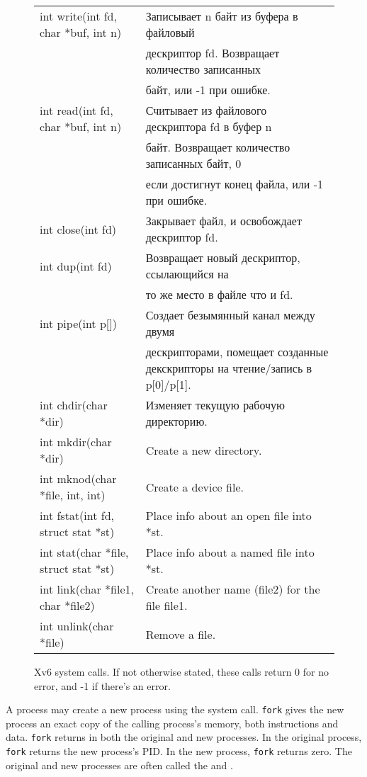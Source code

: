 \begin{figure}[t]
\begin{tabular}{ll}
\midrule
int write(int fd, char *buf, int n) & Записывает n байт из буфера в файловый \\
                                    & дескриптор fd. Возвращает количество записанных \\
                                    & байт, или -1 при ошибке. \\
\midrule
int read(int fd, char *buf, int n) & Считывает из файлового дескриптора fd в буфер n \\
                                   & байт. Возвращает количество записанных байт, 0 \\
                                   & если достигнут конец файла, или -1 при ошибке. \\
\midrule
int close(int fd) & Закрывает файл, и освобождает дескриптор fd. \\
\midrule
int dup(int fd) & Возвращает новый дескриптор, ссылающийся на \\
                & то же место в файле что и fd.\\
\midrule
int pipe(int p[]) & Создает безымянный канал между двумя \\
                  & дескрипторами, помещает созданные декскрипторы на чтение/запись в p[0]/p[1]. \\
\midrule
int chdir(char *dir) & Изменяет текущую рабочую директорию. \\
\midrule
int mkdir(char *dir) & Create a new directory. \\
\midrule
int mknod(char *file, int, int) & Create a device file. \\
\midrule
int fstat(int fd, struct stat *st) & Place info about an open file into *st. \\
\midrule
int stat(char *file, struct stat *st) & Place info about a named file into *st. \\
\midrule
int link(char *file1, char *file2) & Create another name (file2) for the file file1. \\
\midrule
int unlink(char *file) & Remove a file. \\
\midrule
\end{tabular}
\caption{Xv6 system calls. If not otherwise stated, these calls return
0 for no error, and -1 if there's an error.}
\label{fig:api}
\end{figure}

A process may create a new process using the
system call.
\lstinline{fork}
gives the new process an exact copy of the calling
process's memory,
both instructions and data.
\lstinline{fork}
returns in both the original and new processes.
In the original process, \lstinline{fork} returns the new process's
PID.
In the new process, \lstinline{fork} returns zero.
The original and new processes are often called the
and
.

